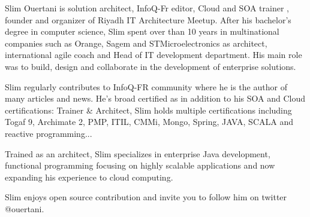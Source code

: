 \documentclass[10pt,a4paper]{article}
\begin{document}
\vspace{-1.3em}  %
\begin{multicols}{2}  %
\hspace{0.5cm} Slim Ouertani is solution architect, InfoQ-Fr editor, Cloud and SOA trainer , founder and organizer of Riyadh IT Architecture Meetup.
After his bachelor's degree in computer science, Slim spent over than 10 years in multinational companies such as Orange, Sagem and STMicroelectronics as architect, international agile coach and Head of IT development department.
His main role was to build, design and collaborate in the development of enterprise solutions.

\hspace{0.5cm} Slim regularly contributes to InfoQ-FR community where he is the author of many articles and news.
He's broad certified as in addition to his SOA and Cloud certifications: Trainer \& Architect, Slim  holds multiple certifications including Togaf 9, Archimate 2, PMP, ITIL, CMMi, Mongo, Spring, JAVA, SCALA and reactive programming...

\hspace{0.5cm} Trained as an architect, Slim specializes in enterprise Java development, functional programming focusing on highly scalable applications and now expanding his experience to cloud computing.

\hspace{0.5cm} Slim enjoys open source contribution and invite you to follow him on twitter @ouertani.

\end{multicols}


\spacedhrule{0em}{-0.4em}

\end{document}
